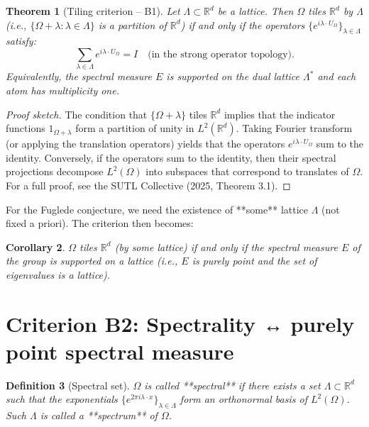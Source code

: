 \documentclass[11pt,a4paper]{article}
\newtheorem{theorem}{Theorem}[section]
\newtheorem{corollary}[theorem]{Corollary}
\newtheorem{definition}[theorem]{Definition}
\begin{document}
\begin{theorem}[Tiling criterion – B1]
Let $\Lambda \subset \mathbb{R}^d$ be a lattice. Then $\Omega$ tiles $\mathbb{R}^d$ by $\Lambda$ (i.e., $\{\Omega + \lambda : \lambda \in \Lambda\}$ is a partition of $\mathbb{R}^d$) if and only if the operators $\{e^{i \lambda \cdot U_\Omega}\}_{\lambda \in \Lambda}$ satisfy:
\[
\sum_{\lambda \in \Lambda} e^{i \lambda \cdot U_\Omega} = I \quad \text{(in the strong operator topology)}.
\]
Equivalently, the spectral measure $E$ is supported on the dual lattice $\Lambda^*$ and each atom has multiplicity one.
\end{theorem}
\begin{proof}[Proof sketch]
The condition that $\{\Omega + \lambda\}$ tiles $\mathbb{R}^d$ implies that the indicator functions $1_{\Omega + \lambda}$ form a partition of unity in $L^2(\mathbb{R}^d)$. Taking Fourier transform (or applying the translation operators) yields that the operators $e^{i \lambda \cdot U_\Omega}$ sum to the identity. Conversely, if the operators sum to the identity, then their spectral projections decompose $L^2(\Omega)$ into subspaces that correspond to translates of $\Omega$. For a full proof, see the SUTL Collective (2025, Theorem 3.1).
\end{proof}

For the Fuglede conjecture, we need the existence of **some** lattice $\Lambda$ (not fixed a priori). The criterion then becomes:

\begin{corollary}
$\Omega$ tiles $\mathbb{R}^d$ (by some lattice) if and only if the spectral measure $E$ of the group is supported on a lattice (i.e., $E$ is purely point and the set of eigenvalues is a lattice).
\end{corollary}

\section{Criterion B2: Spectrality ↔ purely point spectral measure}

\begin{definition}[Spectral set]
$\Omega$ is called **spectral** if there exists a set $\Lambda \subset \mathbb{R}^d$ such that the exponentials $\{e^{2\pi i \lambda \cdot x}\}_{\lambda \in \Lambda}$ form an orthonormal basis of $L^2(\Omega)$. Such $\Lambda$ is called a **spectrum** of $\Omega$.
\end{definition}
\end{document}
